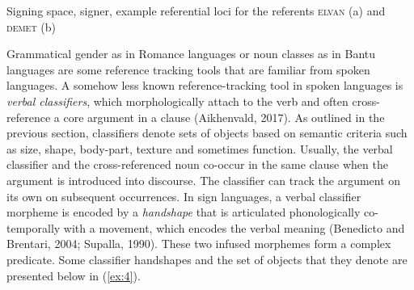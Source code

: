 \documentclass[]{elsarticle} %
\begin{document}
    \begin{exe}
    \ex \label{ex:3} Signing space, signer, example referential loci for the referents \textsc{elvan} (a) and \textsc{demet} (b) \\

    \end{exe}

Grammatical gender as in Romance languages or noun classes as in Bantu
languages are some reference tracking tools that are familiar from
spoken languages. A somehow less known reference-tracking tool in spoken
languages is \emph{verbal classifiers}, which morphologically attach to
the verb and often cross-reference a core argument in a clause
(Aikhenvald, 2017). As outlined in the previous section, classifiers
denote sets of objects based on semantic criteria such as size, shape,
body-part, texture and sometimes function. Usually, the verbal
classifier and the cross-referenced noun co-occur in the same clause
when the argument is introduced into discourse. The classifier can track
the argument on its own on subsequent occurrences. In sign languages, a
verbal classifier morpheme is encoded by a \emph{handshape} that is
articulated phonologically co-temporally with a movement, which encodes
the verbal meaning (Benedicto and Brentari, 2004; Supalla, 1990). These
two infused morphemes form a complex predicate. Some classifier
handshapes and the set of objects that they denote are presented below
in (\ref{ex:4}).
\end{document}
